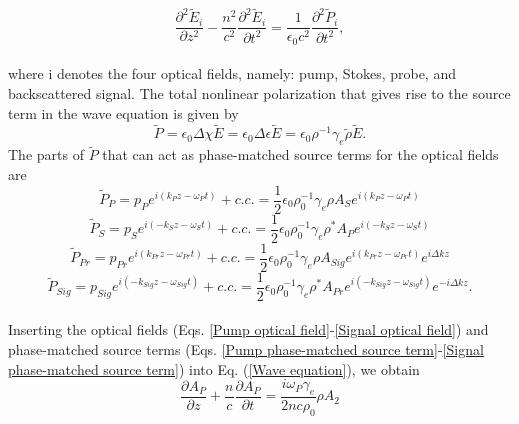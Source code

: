 \documentclass[pdflatex,iicol]{sn-jnl}%
\begin{document}
\begin{equation}
    \frac{\partial^{2}\tilde{E}_{i}}{\partial z^{2}} - \frac{n^{2}}{c^{2}}\frac{\partial^{2}\tilde{E}_{i}}{\partial t^{2}} = \frac{1}{\epsilon_{0}c^{2}}\frac{\partial^{2}\tilde{P}_{i}}{\partial t^{2}},
    \label{Wave equation}
\end{equation}
\\
where i denotes the four optical fields, namely: pump, Stokes, probe, and backscattered signal. The total nonlinear polarization that gives rise to the source term in the wave equation is given by
\begin{equation}
    \tilde{P} = \epsilon_{0}\Delta\chi\tilde{E} = \epsilon_{0}\Delta\epsilon\tilde{E} = \epsilon_{0}\rho^{-1}\gamma_{e}\tilde{\rho}\tilde{E}.
\end{equation}
The parts of $\tilde{P}$ that can act as phase-matched source terms for the optical fields are
\begin{equation}
    \tilde{P}_{P} = p_{P}e^{i(k_{P}z - \omega_{P} t)} + c.c. = \frac{1}{2}\epsilon_{0}\rho_{0}^{-1}\gamma_{e}\rho A_{S}e^{i(k_{P}z - \omega_{P} t)}
    \label{Pump phase-matched source term}
\end{equation}
\begin{equation}
    \tilde{P}_{S} = p_{S}e^{i(-k_{S}z - \omega_{S} t)} + c.c. = \frac{1}{2}\epsilon_{0}\rho_{0}^{-1}\gamma_{e}\rho^{*} A_{P}e^{i(-k_{S}z - \omega_{S} t)}
    \label{Stokes phase-matched source term}
\end{equation}
\begin{equation}
    \tilde{P}_{Pr} = p_{Pr}e^{i(k_{Pr}z - \omega_{Pr} t)} + c.c. = \frac{1}{2}\epsilon_{0}\rho_{0}^{-1}\gamma_{e}\rho A_{Sig}e^{i(k_{Pr}z - \omega_{Pr} t)}e^{i\Delta kz}
    \label{Probe phase-matched source term}
\end{equation}
\begin{equation}
    \tilde{P}_{Sig} = p_{Sig}e^{i(-k_{Sig}z - \omega_{Sig} t)} + c.c. = \frac{1}{2}\epsilon_{0}\rho_{0}^{-1}\gamma_{e}\rho^{*} A_{Pr}e^{i(-k_{Sig}z - \omega_{Sig} t)}e^{-i\Delta kz}.
    \label{Signal phase-matched source term}
\end{equation}
\\
Inserting the optical fields (Eqs. \ref{Pump optical field}-\ref{Signal optical field}) and phase-matched source terms (Eqs. \ref{Pump phase-matched source term}-\ref{Signal phase-matched source term}) into Eq. (\ref{Wave equation}), we obtain
\begin{equation}
    \frac{\partial A_{P}}{\partial z} + \frac{n}{c}\frac{\partial A_{P}}{\partial t} = \frac{i\omega_{P}\gamma_{e}}{2nc\rho_{0}}\rho A_{2}
\end{equation}
\end{document}
